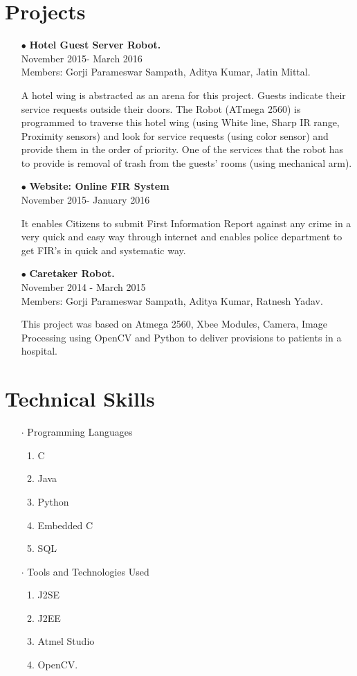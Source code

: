 \documentclass[12pt]{article}
\begin{document}
\section*{Projects}
\begin{itemize}
\item[$\bullet$]\textbf{Hotel Guest Server Robot.}\\November 2015- March 2016\\Members: Gorji Parameswar Sampath, Aditya Kumar, Jatin Mittal.

A hotel wing is abstracted as an arena for this project. Guests indicate their service requests outside their doors. The Robot (ATmega 2560) is programmed to traverse this hotel wing (using White line, Sharp IR range, Proximity sensors) and look for service requests (using color sensor) and provide them in the order of priority. One of the services that the robot has to provide is removal of trash from the guests’ rooms (using mechanical arm).
\item[$\bullet$]\textbf{Website: Online FIR System}\\November 2015- January 2016

It enables Citizens to submit First Information Report against any crime in a very quick and easy way through internet and enables police department to get FIR’s in quick and systematic way.
\item[$\bullet$]\textbf{Caretaker Robot.}\\November 2014 - March 2015 \\Members: Gorji Parameswar Sampath, Aditya Kumar, Ratnesh Yadav.

This project was based on Atmega 2560, Xbee Modules, Camera, Image Processing using OpenCV and Python to deliver provisions to patients in a hospital.
\end{itemize}
\section*{Technical Skills}
\begin{itemize}
\item[$\cdot$]Programming Languages
\begin{enumerate}
\item C
\item Java
\item Python
\item Embedded C
\item SQL
\end{enumerate}
\item[$\cdot$]Tools and Technologies Used
\begin{enumerate}
\item J2SE
\item J2EE
\item Atmel Studio
\item OpenCV.
\end{enumerate}
\end{itemize}
\end{document}
